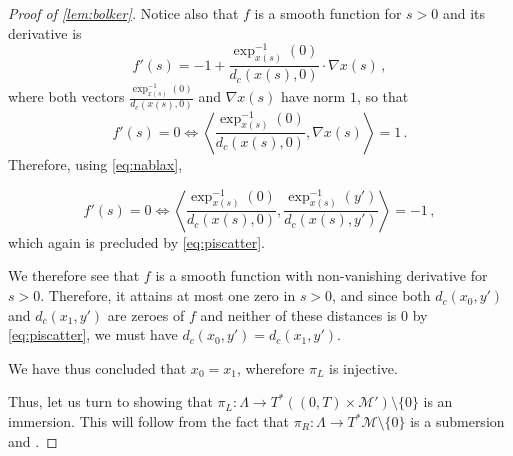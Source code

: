 \documentclass[
	fontsize=11pt, 
	twoside=false, 
	abstract=true, 
	a4paper,
]{scrartcl}
\newcommand{\sem}{\setminus\{0\}}
\newcommand{\abs}[1]{\left\lvert#1\right\rvert}
\newcommand{\del}{\partial}
\begin{document}
\begin{proof}[Proof of \cref{lem:bolker}]
	Notice also that $f$ is a smooth function for $s>0$ and its derivative is 
	\[
		f'(s) = -1+\frac{\exp_{x(s)}^{-1}(0)}{d_c(x(s),0)}\cdot \nabla x(s)\,,
	\]
	where both vectors $\frac{\exp_{x(s)}^{-1}(0)}{d_c(x(s),0)}$ and $\nabla x(s)$ have norm $1$, so that
	\[
		f'(s) =0 \iff \left\langle \frac{\exp_{x(s)}^{-1}(0)}{d_c(x(s),0)}, \nabla x(s)\right\rangle = 1\,.
	\]
	Therefore, using \cref{eq:nablax},%

	\[
		f'(s) =0 \iff \left\langle \frac{\exp_{x(s)}^{-1}(0)}{d_c(x(s),0)}, \frac{\exp_{x(s)}^{-1}(y')}{d_c(x(s),y')}\right\rangle = -1\,,
	\]
	which again is precluded by \cref{eq:piscatter}.

	We therefore see that $f$ is a smooth function with non-vanishing derivative for $s>0$. Therefore, it attains at most one zero in $s>0$, and since both $d_c(x_0,y')$ and $d_c(x_1,y')$ are zeroes of $f$ and neither of these distances is $0$ by \cref{eq:piscatter}, we must have $d_c(x_0,y')=d_c(x_1,y')$.
	
	We have thus concluded that $x_0 = x_1$, wherefore $\pi_L$ is injective. 

%
%
%
%
%
%
	Thus, let us turn to showing that $\pi_L \colon \Lambda \to T^\ast((0,T)\times\mathcal{M}')\sem$ is an immersion. This will follow from the fact that $\pi_R \colon \Lambda \to T^\ast\mathcal{M}\sem$ is a submersion and \cite[Lem.~4.3]{zbMATH01860565}.%


\end{proof}
\end{document}
